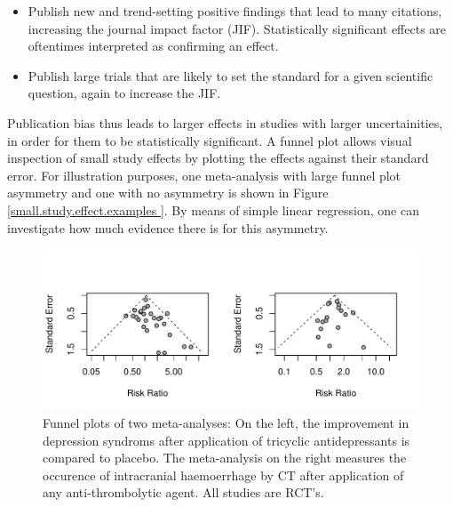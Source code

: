 \documentclass[11pt,a4paper,twoside]{book}\usepackage[]{graphicx}\usepackage[]{color}
\makeatletter
\def\maxwidth{ %
  \ifdim\Gin@nat@width>\linewidth
    \linewidth
  \else
    \Gin@nat@width
  \fi
}
\newenvironment{knitrout}{}{} %
\makeatother
\begin{document}
\begin{itemize}
\item Publish new and trend-setting positive findings that lead to many citations, increasing the journal impact factor (JIF). Statistically significant effects are oftentimes interpreted as confirming an effect.
\item Publish large trials that are likely to set the standard for a given scientific question, again to increase the JIF.
\end{itemize}

Publication bias thus leads to larger effects in studies with larger uncertainities, in order for them to be statistically significant. A funnel plot \citep{funnel.plot} allows visual inspection of small study effects by plotting the effects against their standard error. For illustration purposes, one meta-analysis with large funnel plot asymmetry and one with no asymmetry is shown in Figure \ref{small.study.effect.examples }. %
By means of simple linear regression, one can investigate how much evidence there is for this asymmetry. 

\begin{figure}
\begin{knitrout}
\color{fgcolor}
\includegraphics[width=\maxwidth]{figure/unnamed-chunk-1-1} 

\end{knitrout}
\caption{Funnel plots of two meta-analyses: On the left, the improvement in depression syndroms after application of tricyclic antidepressants is compared to placebo. The meta-analysis on the right measures the occurence of intracranial haemoerrhage by CT after application of any anti-thrombolytic agent. All studies are RCT's.}
\label{small.study.effect.examples}
\end{figure}
\end{document}
